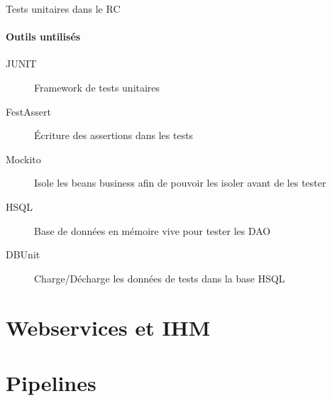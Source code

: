 \documentclass[compact]{beamer}%
\begin{document}
\begin{frame}{Tests unitaires dans le RC}
	\framesubtitle{Outils untilisés}
	
	\begin{description}
	\item[JUNIT] Framework de tests unitaires
	\item[FestAssert] Écriture des assertions dans les tests
	\item[Mockito] Isole les beans business afin de pouvoir les isoler avant de les tester
	\item[HSQL] Base de données en mémoire vive pour tester les DAO
	\item[DBUnit] Charge/Décharge les données de tests dans la base HSQL
	\end{description}

\end{frame}

\section{Webservices et IHM}


\section{Pipelines}

\end{document}
